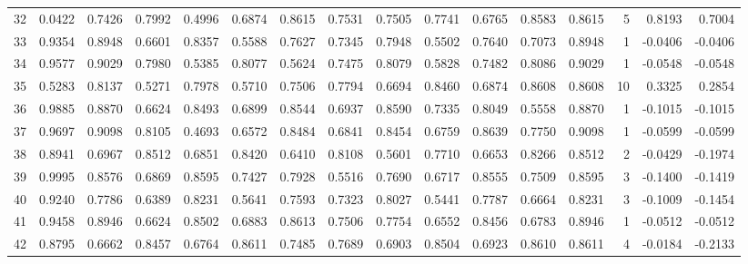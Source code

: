 \begin{tabular}{lrrrrrrrrrrrrrrr}
32  &      0.0422 &  0.7426 &  0.7992 &  0.4996 &  0.6874 &  0.8615 &  0.7531 &  0.7505 &  0.7741 &  0.6765 &   0.8583 &     0.8615 &      5 &                    0.8193 &                     0.7004 \\
33  &      0.9354 &  0.8948 &  0.6601 &  0.8357 &  0.5588 &  0.7627 &  0.7345 &  0.7948 &  0.5502 &  0.7640 &   0.7073 &     0.8948 &      1 &                   -0.0406 &                    -0.0406 \\
34  &      0.9577 &  0.9029 &  0.7980 &  0.5385 &  0.8077 &  0.5624 &  0.7475 &  0.8079 &  0.5828 &  0.7482 &   0.8086 &     0.9029 &      1 &                   -0.0548 &                    -0.0548 \\
35  &      0.5283 &  0.8137 &  0.5271 &  0.7978 &  0.5710 &  0.7506 &  0.7794 &  0.6694 &  0.8460 &  0.6874 &   0.8608 &     0.8608 &     10 &                    0.3325 &                     0.2854 \\
36  &      0.9885 &  0.8870 &  0.6624 &  0.8493 &  0.6899 &  0.8544 &  0.6937 &  0.8590 &  0.7335 &  0.8049 &   0.5558 &     0.8870 &      1 &                   -0.1015 &                    -0.1015 \\
37  &      0.9697 &  0.9098 &  0.8105 &  0.4693 &  0.6572 &  0.8484 &  0.6841 &  0.8454 &  0.6759 &  0.8639 &   0.7750 &     0.9098 &      1 &                   -0.0599 &                    -0.0599 \\
38  &      0.8941 &  0.6967 &  0.8512 &  0.6851 &  0.8420 &  0.6410 &  0.8108 &  0.5601 &  0.7710 &  0.6653 &   0.8266 &     0.8512 &      2 &                   -0.0429 &                    -0.1974 \\
39  &      0.9995 &  0.8576 &  0.6869 &  0.8595 &  0.7427 &  0.7928 &  0.5516 &  0.7690 &  0.6717 &  0.8555 &   0.7509 &     0.8595 &      3 &                   -0.1400 &                    -0.1419 \\
40  &      0.9240 &  0.7786 &  0.6389 &  0.8231 &  0.5641 &  0.7593 &  0.7323 &  0.8027 &  0.5441 &  0.7787 &   0.6664 &     0.8231 &      3 &                   -0.1009 &                    -0.1454 \\
41  &      0.9458 &  0.8946 &  0.6624 &  0.8502 &  0.6883 &  0.8613 &  0.7506 &  0.7754 &  0.6552 &  0.8456 &   0.6783 &     0.8946 &      1 &                   -0.0512 &                    -0.0512 \\
42  &      0.8795 &  0.6662 &  0.8457 &  0.6764 &  0.8611 &  0.7485 &  0.7689 &  0.6903 &  0.8504 &  0.6923 &   0.8610 &     0.8611 &      4 &                   -0.0184 &                    -0.2133 \\

\end{tabular}
